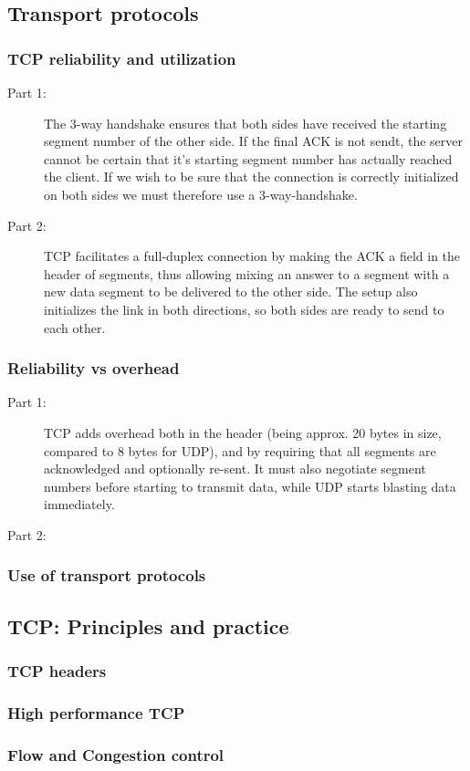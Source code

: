 \subsection{Transport protocols}
\subsubsection{TCP reliability and utilization}
\begin{description}
    \item[Part 1:] The 3-way handshake ensures that both sides have received the starting segment number of the other side.
        If the final ACK is not sendt, the server cannot be certain that it's starting segment number has actually
        reached the client. If we wish to be sure that the connection is correctly initialized on both sides we must
        therefore use a 3-way-handshake.
    \item[Part 2:] TCP facilitates a full-duplex connection by making the ACK a field in the header of segments, thus
        allowing mixing an answer to a segment with a new data segment to be delivered to the other side. The setup also
        initializes the link in both directions, so both sides are ready to send to each other.
\end{description}

\subsubsection{Reliability vs overhead}
\begin{description}
    \item[Part 1:] TCP adds overhead both in the header (being approx. 20 bytes in size, compared to 8 bytes for UDP), and
        by requiring that all segments are acknowledged and optionally re-sent. It must also negotiate segment numbers before
        starting to transmit data, while UDP starts blasting data immediately.
    \item[Part 2:] 
\end{description}

\subsubsection{Use of transport protocols}

\subsection{TCP: Principles and practice}
\subsubsection{TCP headers}
\subsubsection{High performance TCP}
\subsubsection{Flow and Congestion control}
